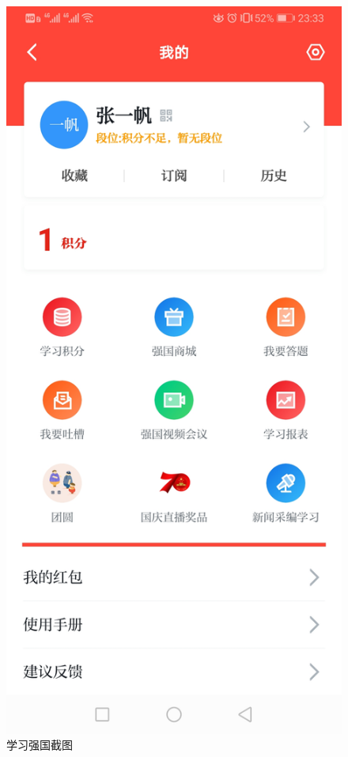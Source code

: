 \documentclass{article}
\begin{document}
\begin{figure}[h!]
	\centering
	\includegraphics[scale=0.2]{xue.jpg}
	\caption{学习强国截图}
	\label{fig:ggwrc.jpg}
\end{figure}
\end{document}
